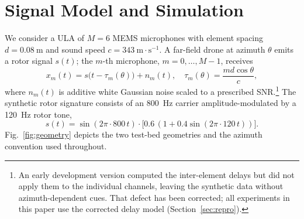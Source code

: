 \documentclass[5p,twocolumn]{elsarticle}
\begin{document}
\section{Signal Model and Simulation}
\label{sec:signal}
We consider a ULA of $M=6$ MEMS microphones with element spacing $d=\SI{0.08}{\meter}$ and sound speed $c=343\ \mathrm{m\cdot s^{-1}}$. A far-field drone at azimuth $\theta$ emits a rotor signal $s(t)$; the $m$-th microphone, $m=0,\dots,M-1$, receives
\begin{equation}
    x_m(t) = s\bigl(t - \tau_m(\theta)\bigr) + n_m(t), \quad \tau_m(\theta)=\frac{m d \cos\theta}{c},
    \label{eq:signal}
\end{equation}
where $n_m(t)$ is additive white Gaussian noise scaled to a prescribed SNR.\footnote{An early development version computed the inter-element delays but did not apply them to the individual channels, leaving the synthetic data without azimuth-dependent cues. That defect has been corrected; all experiments in this paper use the corrected delay model (Section~\ref{sec:repro}).} The synthetic rotor signature consists of an \SI{800}{\hertz} carrier amplitude-modulated by a \SI{120}{\hertz} rotor tone,
\begin{equation}
    s(t)=\sin(2\pi\cdot 800\,t)\cdot\bigl[0.6\,(1+0.4\sin(2\pi\cdot 120\,t))\bigr].
    \label{eq:rotor}
\end{equation}
Fig.~\ref{fig:geometry} depicts the two test-bed geometries and the azimuth convention used throughout.
\end{document}
